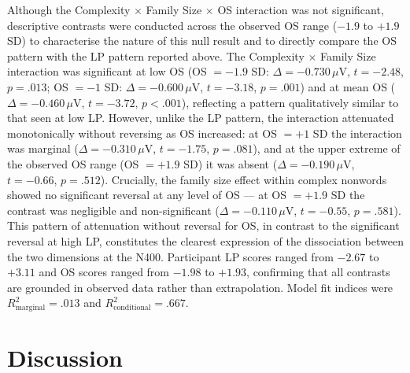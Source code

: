 \documentclass[utf8]{FrontiersinHarvard} %
\begin{document}
	Although the Complexity $\times$ Family Size $\times$ OS interaction was not significant, descriptive contrasts were conducted across the observed OS range ($-1.9$ to $+1.9$ SD) to characterise the nature of this null result and to directly compare the OS pattern with the LP pattern reported above. The Complexity $\times$ Family Size interaction was significant at low OS (OS $= -1.9$ SD: $\Delta = -0.730\,\mu$V, $t = -2.48$, $p = .013$; OS $= -1$ SD: $\Delta = -0.600\,\mu$V, $t = -3.18$, $p = .001$) and at mean OS ($\Delta = -0.460\,\mu$V, $t = -3.72$, $p < .001$), reflecting a pattern qualitatively similar to that seen at low LP. However, unlike the LP pattern, the interaction attenuated monotonically without reversing as OS increased: at OS $= +1$ SD the interaction was marginal ($\Delta = -0.310\,\mu$V, $t = -1.75$, $p = .081$), and at the upper extreme of the observed OS range (OS $= +1.9$ SD) it was absent ($\Delta = -0.190\,\mu$V, $t = -0.66$, $p = .512$). Crucially, the family size effect within complex nonwords showed no significant reversal at any level of OS --- at OS $= +1.9$ SD the contrast was negligible and non-significant ($\Delta = -0.110\,\mu$V, $t = -0.55$, $p = .581$). This pattern of attenuation without reversal for OS, in contrast to the significant reversal at high LP, constitutes the clearest expression of the dissociation between the two dimensions at the N400. Participant LP scores ranged from $-2.67$ to $+3.11$ and OS scores ranged from $-1.98$ to $+1.93$, confirming that all contrasts are grounded in observed data rather than extrapolation. Model fit indices were $R^2_{\text{marginal}} = .013$ and $R^2_{\text{conditional}} = .667$.
	
	\section{Discussion}
	
\end{document}
